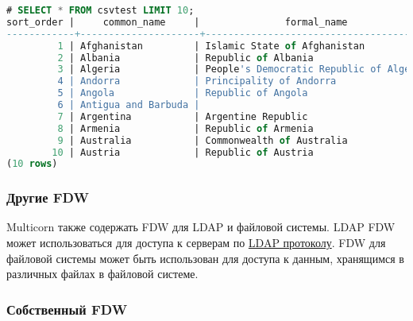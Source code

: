 \begin{lstlisting}[language=SQL,label=lst:pgmulticorn-csv2,caption=Multicorn]
# SELECT * FROM csvtest LIMIT 10;
sort_order |     common_name     |               formal_name               |     main_type     | sub_type | sovereignty |     capital
------------+---------------------+-----------------------------------------+-------------------+----------+-------------+------------------
         1 | Afghanistan         | Islamic State of Afghanistan            | Independent State |          |             | Kabul
         2 | Albania             | Republic of Albania                     | Independent State |          |             | Tirana
         3 | Algeria             | People's Democratic Republic of Algeria | Independent State |          |             | Algiers
         4 | Andorra             | Principality of Andorra                 | Independent State |          |             | Andorra la Vella
         5 | Angola              | Republic of Angola                      | Independent State |          |             | Luanda
         6 | Antigua and Barbuda |                                         | Independent State |          |             | Saint John's
         7 | Argentina           | Argentine Republic                      | Independent State |          |             | Buenos Aires
         8 | Armenia             | Republic of Armenia                     | Independent State |          |             | Yerevan
         9 | Australia           | Commonwealth of Australia               | Independent State |          |             | Canberra
        10 | Austria             | Republic of Austria                     | Independent State |          |             | Vienna
(10 rows)
\end{lstlisting}


\subsubsection{Другие FDW}

Multicorn также содержать FDW для LDAP и файловой системы. LDAP FDW может использоваться для доступа к серверам по \href{http://ru.wikipedia.org/wiki/LDAP}{LDAP протоколу}. FDW для файловой системы может быть использован для доступа к данным, хранящимся в различных файлах в файловой системе.

\subsubsection{Собственный FDW}

